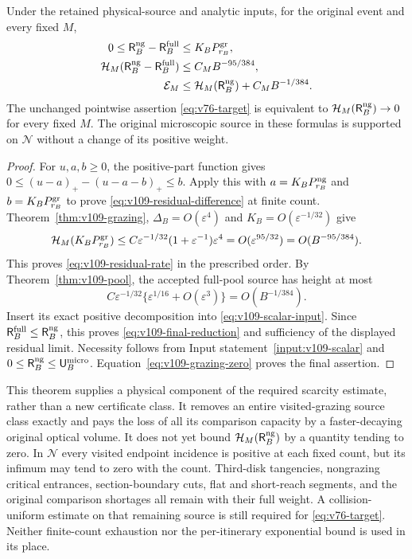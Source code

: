 \begin{theorem}
\label{thm:v109-residual}
Under the retained physical-source and analytic inputs, for the
original event and every fixed $M$,
\begin{align}
 0\leq\mathsf R_B^{\rm ng}-\mathsf R_B^{\rm full}
     &\leq K_BP_{r_B}^{\rm gr},\label{eq:v109-residual-difference}\\
 \mathcal H_M(\mathsf R_B^{\rm ng}-\mathsf R_B^{\rm full})
     &\leq C_MB^{-95/384},\label{eq:v109-residual-rate}\\
 \mathcal E_M&\leq\mathcal H_M(\mathsf R_B^{\rm ng})
                                     +C_MB^{-1/384}.
                                     \label{eq:v109-final-reduction}
\end{align}
The unchanged pointwise assertion \eqref{eq:v76-target} is equivalent
to $\mathcal H_M(\mathsf R_B^{\rm ng})\to0$ for every fixed $M$.
The original microscopic source in these formulas is supported on
$\mathcal N$ without a change of its positive weight.
\end{theorem}
\begin{proof}
For $u,a,b\geq0$, the positive-part function gives
$0\leq(u-a)_+-(u-a-b)_+\leq b$.
Apply this with $a=K_BP_{r_B}^{\rm ng}$ and
$b=K_BP_{r_B}^{\rm gr}$ to prove
\eqref{eq:v109-residual-difference} at finite count.
Theorem~\ref{thm:v109-grazing}, $\Delta_B=O(\varepsilon^4)$ and
$K_B=O(\varepsilon^{-1/32})$ give
\[
 \mathcal H_M(K_BP_{r_B}^{\rm gr})
 \leq C\varepsilon^{-1/32}(1+\varepsilon^{-1})\varepsilon^4
 =O(\varepsilon^{95/32})=O(B^{-95/384}).
\]
This proves \eqref{eq:v109-residual-rate} in the prescribed order.
By Theorem~\ref{thm:v109-pool}, the accepted full-pool source has
height at most
\[
 C\varepsilon^{-1/32}\{
                 \varepsilon^{1/16}+O(\varepsilon^3)\}
 =O(B^{-1/384}).
\]
Insert its exact positive decomposition into
\eqref{eq:v109-scalar-input}. Since
$\mathsf R_B^{\rm full}\leq\mathsf R_B^{\rm ng}$, this proves
\eqref{eq:v109-final-reduction} and sufficiency of the displayed
residual limit. Necessity follows from Input
statement~\ref{input:v109-scalar} and
$0\leq\mathsf R_B^{\rm ng}\leq\mathsf U_B^{\rm micro}$.
Equation~\eqref{eq:v109-grazing-zero} proves the final assertion.
\end{proof}

This theorem supplies a physical component of the required scarcity
estimate, rather than a new certificate class. It removes an entire
visited-grazing source class exactly and pays the loss of all its
comparison capacity by a faster-decaying original optical volume.
It does not yet bound $\mathcal H_M(\mathsf R_B^{\rm ng})$ by a
quantity tending to zero. In $\mathcal N$ every visited endpoint
incidence is positive at each fixed count, but its infimum may tend
to zero with the count. Third-disk tangencies, nongrazing critical
entrances, section-boundary cuts, flat and short-reach segments, and
the original comparison shortages all remain with their full weight.
A collision-uniform estimate on that remaining source is still
required for \eqref{eq:v76-target}. Neither finite-count exhaustion
nor the per-itinerary exponential bound is used in its place.
